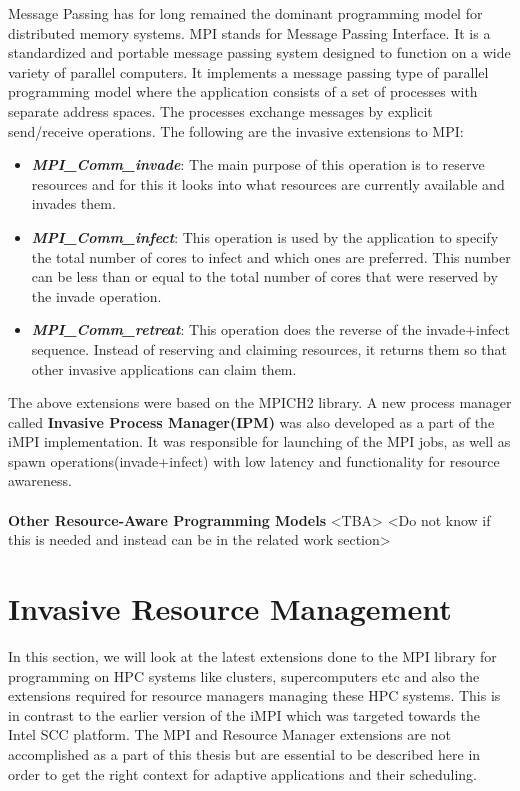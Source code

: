 Message Passing has for long remained the dominant programming model for distributed memory systems. MPI stands for Message Passing Interface. It is a standardized and portable message passing system designed to function on a wide variety of parallel computers. It implements a message passing type of parallel programming model where the application consists of a set of processes with separate address spaces. The processes exchange messages by explicit send/receive operations. The following are the invasive extensions to MPI:
\begin{itemize}
\item \textbf{\textit{MPI\_Comm\_invade}}: The main purpose of this operation is to reserve resources and for this it looks into what resources are currently available and invades them.
\item \textbf{\textit{MPI\_Comm\_infect}}: This operation is used by the application to specify the total number of cores to infect and which ones are preferred. This number can be less than or equal to the total number of cores that were reserved by the invade operation. 
\item \textbf{\textit{MPI\_Comm\_retreat}}: This operation does the reverse of the invade+infect sequence. Instead of reserving and claiming resources, it returns them so that other invasive applications can claim them.
\end{itemize}
The above extensions were based on the MPICH2 library. A new process manager called \textbf{Invasive Process Manager(IPM)} was also developed as a part of the iMPI implementation. It was responsible for launching of the MPI jobs, as well as spawn operations(invade+infect) with low latency and functionality for resource awareness.\\ \\
\textbf{Other Resource-Aware Programming Models} <TBA> <Do not know if this is needed and instead can be in the related work section>
\section{Invasive Resource Management}
In this section, we will look at the latest extensions done to the MPI library for programming on HPC systems like clusters, supercomputers etc and also the extensions required for resource managers managing these HPC systems. This is in contrast to the earlier version of the iMPI which was targeted towards the Intel SCC platform. The MPI and Resource Manager extensions are not accomplished as a part of this thesis but are essential to be described here in order to get the right context for adaptive applications and their scheduling.
